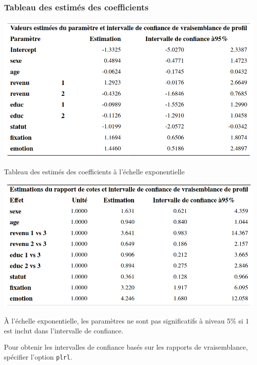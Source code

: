 \documentclass{beamer}
\begin{document}
\begin{frame}
 \frametitle{Tableau des estimés des coefficients}
 \begin{center}
\includegraphics[width = 0.8\linewidth]{img/c4/diapos8-e14.png}
\end{center}

\end{frame}
\begin{frame}{Tableau des estimés des coefficients à l'échelle exponentielle}
\begin{center}
 \includegraphics[width = 0.8\linewidth]{img/c4/diapos8-e15.png}
\end{center}
{\footnotesize 
\bi\item À l'échelle exponentielle, les paramètres ne sont pas significatifs à niveau 5\% si $1$ est inclut dans l'intervalle de confiance.
\item 
Pour obtenir les intervalles de confiance basés sur les rapports de vraisemblance, spécifier l'option \texttt{plrl}.
\ei
}
\end{frame}
\end{document}
